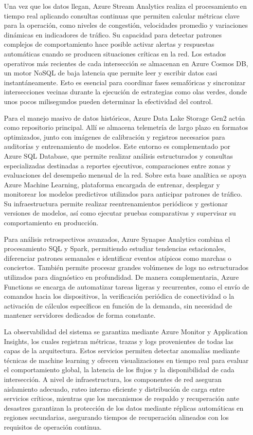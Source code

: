 \documentclass[12pt,a4paper,oneside]{report}
\begin{document}
Una vez que los datos llegan, Azure Stream Analytics realiza el procesamiento en tiempo real aplicando consultas continuas que permiten calcular métricas clave para la operación, como niveles de congestión, velocidades promedio y variaciones dinámicas en indicadores de tráfico. Su capacidad para detectar patrones complejos de comportamiento hace posible activar alertas y respuestas automáticas cuando se producen situaciones críticas en la red. Los estados operativos más recientes de cada intersección se almacenan en Azure Cosmos DB, un motor NoSQL de baja latencia que permite leer y escribir datos casi instantáneamente. Esto es esencial para coordinar fases semafóricas y sincronizar intersecciones vecinas durante la ejecución de estrategias como olas verdes, donde unos pocos milisegundos pueden determinar la efectividad del control.

Para el manejo masivo de datos históricos, Azure Data Lake Storage Gen2 actúa como repositorio principal. Allí se almacena telemetría de largo plazo en formatos optimizados, junto con imágenes de calibración y registros necesarios para auditorías y entrenamiento de modelos. Este entorno es complementado por Azure SQL Database, que permite realizar análisis estructurados y consultas especializadas destinadas a reportes ejecutivos, comparaciones entre zonas y evaluaciones del desempeño mensual de la red. Sobre esta base analítica se apoya Azure Machine Learning, plataforma encargada de entrenar, desplegar y monitorear los modelos predictivos utilizados para anticipar patrones de tráfico. Su infraestructura permite realizar reentrenamientos periódicos y gestionar versiones de modelos, así como ejecutar pruebas comparativas y supervisar su comportamiento en producción.

Para análisis retrospectivos avanzados, Azure Synapse Analytics combina el procesamiento SQL y Spark, permitiendo estudiar tendencias estacionales, diferenciar patrones semanales e identificar eventos atípicos como marchas o conciertos. También permite procesar grandes volúmenes de logs no estructurados utilizados para diagnóstico en profundidad. De manera complementaria, Azure Functions se encarga de automatizar tareas ligeras y recurrentes, como el envío de comandos hacia los dispositivos, la verificación periódica de conectividad o la activación de cálculos específicos en función de la demanda, sin necesidad de mantener servidores dedicados de forma constante.

La observabilidad del sistema se garantiza mediante Azure Monitor y Application Insights, los cuales registran métricas, trazas y logs provenientes de todas las capas de la arquitectura. Estos servicios permiten detectar anomalías mediante técnicas de machine learning y ofrecen visualizaciones en tiempo real para evaluar el comportamiento global, la latencia de los flujos y la disponibilidad de cada intersección. A nivel de infraestructura, los componentes de red aseguran aislamiento adecuado, ruteo interno eficiente y distribución de carga entre servicios críticos, mientras que los mecanismos de respaldo y recuperación ante desastres garantizan la protección de los datos mediante réplicas automáticas en regiones secundarias, asegurando tiempos de recuperación alineados con los requisitos de operación continua.
\end{document}
